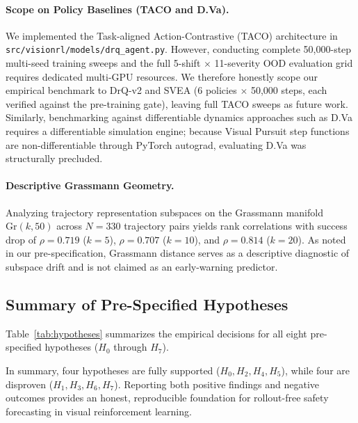 \paragraph{Scope on Policy Baselines (TACO and D.Va).}
We implemented the Task-aligned Action-Contrastive (TACO) architecture in \texttt{src/visionrl/models/drq\_agent.py}. 
However, conducting complete 50,000-step multi-seed training sweeps and the full 5-shift $\times$ 11-severity OOD evaluation grid requires dedicated multi-GPU resources. 
We therefore honestly scope our empirical benchmark to DrQ-v2 and SVEA (6 policies $\times$ 50,000 steps, each verified against the pre-training gate), leaving full TACO sweeps as future work. 
Similarly, benchmarking against differentiable dynamics approaches such as D.Va requires a differentiable simulation engine; because Visual Pursuit step functions are non-differentiable through PyTorch autograd, evaluating D.Va was structurally precluded.

\paragraph{Descriptive Grassmann Geometry.}
Analyzing trajectory representation subspaces on the Grassmann manifold $\mathrm{Gr}(k, 50)$ across $N = 330$ trajectory pairs yields rank correlations with success drop of $\rho = 0.719$ ($k = 5$), $\rho = 0.707$ ($k = 10$), and $\rho = 0.814$ ($k = 20$).
As noted in our pre-specification, Grassmann distance serves as a descriptive diagnostic of subspace drift and is not claimed as an early-warning predictor.

\subsection{Summary of Pre-Specified Hypotheses}
\label{sec:results:hypotheses_summary}

Table~\ref{tab:hypotheses} summarizes the empirical decisions for all eight pre-specified hypotheses ($H_0$ through $H_7$).



In summary, four hypotheses are fully supported ($H_0, H_2, H_4, H_5$), while four are disproven ($H_1, H_3, H_6, H_7$).
Reporting both positive findings and negative outcomes provides an honest, reproducible foundation for rollout-free safety forecasting in visual reinforcement learning.
